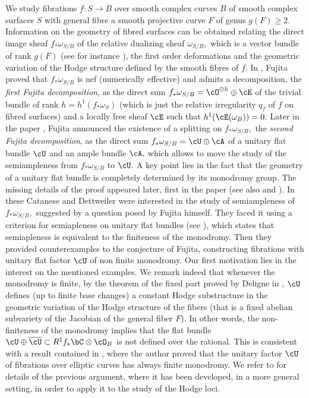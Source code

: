 \documentclass[a4paper,11pt]{amsart}
\begin{document}
We study fibrations $f:S\to B$ over smooth complex curves $B$ of smooth complex surfaces $S$ with general fibre a smooth projective curve $F$ of genus $g(F)\geq 2.$ Information on the geometry of fibred surfaces can be obtained relating the direct image sheaf $f_\ast\omega_{S/B}$ of the relative dualizing sheaf $\omega_{S/B},$ which is a vector bundle of rank $g(F)$ (see for instance  \cite{Fuj78a}), the first order deformations and the geometric variation of the Hodge structure defined by the smooth fibres  of $f.$ In  \cite{Fuj78a}, Fujita proved that $f_\ast\omega_{S/B}$ is nef (numerically effective) and admits a decomposition, the {\em first Fujita decomposition}, as the direct sum $f_\ast\omega_{S/B}=\cO^{\oplus h}\oplus \cE$ of the trivial bundle of rank $h=h^1(f_\ast\omega_S)$ (which is just the relative irregularity $q_f$ of $f$ on fibred surfaces) and a locally free sheaf $\cE$ such that $h^1(\cE(\omega_B))=0.$ Later in the paper \cite{Fuj78b}, Fujita announced the existence of a splitting on $f_\ast\omega_{S/B},$ the {\em second Fujita decomposition}, as the direct sum $f_\ast\omega_{S/B}=\cU\oplus \cA$ of a unitary flat bundle $\cU$ and an ample bundle $\cA,$ which allows to move the study of the semiampleness from $f_\ast\omega_{S/B}$ to $\cU.$ A key point lies in the fact that the geometry of a unitary flat bundle is completely determined by its monodromy group. The missing details of the proof appeared later, first in the paper \cite{CatDet_TheDirectImage_2014} (see also \cite{CD:Answer_2017} and \cite{CatDet_Vector_2016}). In these Catanese and Dettweiler were interested in the study of semiampleness of $f_\ast\omega_{S/B},$ suggested by a question posed by Fujita himself. They faced it using a criterion for semiapleness on unitary flat bundles (see \cite[Theorem 2.5]{CD:Answer_2017}), which states that semiapleness is equivalent to the finiteness of the monodromy. Then they provided counterexamples to the conjecture of Fujita, constructing fibrations with unitary flat factor $\cU$ of non finite monodromy. Our first motivation lies in the interest on the mentioned examples.
 We remark indeed that whenever the monodromy is finite, by the theorem of the fixed part proved by Deligne in \cite{Del_Theorie_1971}, $\cU$ defines (up to finite base changes) a constant Hodge substructure in the geometric variation of the Hodge structure of the fibers (that is a fixed abelian subvariety of the Jacobian of the general fiber $F$). In other words, the non-finiteness of the monodromy implies that the flat bundle\ \ $\cU\oplus \overline\cU\subset R^1f_\ast\bC\otimes \cO_B$ is not defined over the rational. This is consistent with a result contained in \cite{barja-fujita}, where the author proved that the unitary factor $\cU$ of fibrations over elliptic curves has always finite monodromy. We refer to  \cite{FGP} for details of the previous argument, where it has been developed, in a more general setting, in order to apply it to the study of the Hodge loci.
 
\end{document}
